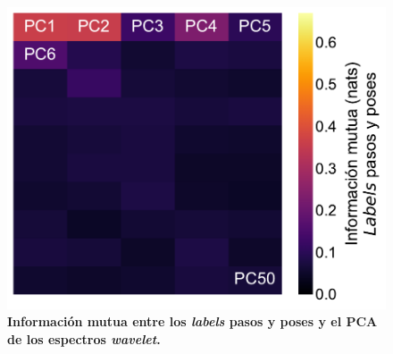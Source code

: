 \begin{appendix}
    \begin{figure}[htbp]
        \centering
        \includegraphics[width=0.7\linewidth]{figuras/capitulo4/mi_contra_labels_pca.pdf}
        \caption{\textbf{Información mutua entre los \textit{labels} pasos y poses y el PCA de los espectros \textit{wavelet}.}}
        \label{fig:capitulo4_mi_contra_labels_pca}
    \end{figure}

\end{appendix}